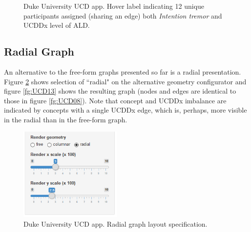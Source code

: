 \documentclass[10pt, letterpaper]{article}
\begin{document}
\begin{spacing}{1.0}
\begin{figure}[H]
    \centering
    \caption{Duke University UCD app.  Hover label indicating 12 unique participants assigned (sharing an edge) both \textit{Intention tremor} and UCDDx level of ALD.}
    \label{fg:UCD11}
\end{figure}

\subsection{Radial Graph}

An alternative to the free-form graphs presented so far is a radial presentation.  Figure \ref{fg:UCD12} shows selection of ``radial" on the alternative geometry configurator and figure \ref{fg:UCD13} shows the resulting graph (nodes and edges are identical to those in figure \ref{fg:UCD08}).  Note that concept and UCDDx imbalance are indicated by concepts with a single UCDDx edge, which is, perhaps, more visible in the radial than in the free-form graph.\\

\begin{figure}[H]
    \includegraphics[width=2in]{UCD12.png}
    \centering
    \caption{Duke University UCD app.  Radial graph layout specification.}
    \label{fg:UCD12}
\end{figure}


\end{spacing}
\end{document}
